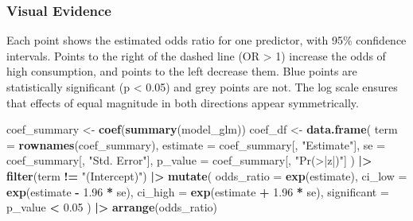 \documentclass[
]{article}
\newenvironment{Shaded}{\begin{snugshade}}{\end{snugshade}}
\newcommand{\AttributeTok}[1]{\textcolor[rgb]{0.13,0.29,0.53}{#1}}
\newcommand{\FloatTok}[1]{\textcolor[rgb]{0.00,0.00,0.81}{#1}}
\newcommand{\FunctionTok}[1]{\textcolor[rgb]{0.13,0.29,0.53}{\textbf{#1}}}
\newcommand{\NormalTok}[1]{#1}
\newcommand{\OtherTok}[1]{\textcolor[rgb]{0.56,0.35,0.01}{#1}}
\newcommand{\SpecialCharTok}[1]{\textcolor[rgb]{0.81,0.36,0.00}{\textbf{#1}}}
\newcommand{\StringTok}[1]{\textcolor[rgb]{0.31,0.60,0.02}{#1}}
\begin{document}
\subsubsection{Visual Evidence}\label{visual-evidence-2}

Each point shows the estimated odds ratio for one predictor, with 95\%
confidence intervals. Points to the right of the dashed line (OR
\textgreater{} 1) increase the odds of high consumption, and points to
the left decrease them. Blue points are statistically significant (p
\textless{} 0.05) and grey points are not. The log scale ensures that
effects of equal magnitude in both directions appear symmetrically.

\begin{Shaded}
\begin{Highlighting}[]
\NormalTok{coef\_summary }\OtherTok{\textless{}{-}} \FunctionTok{coef}\NormalTok{(}\FunctionTok{summary}\NormalTok{(model\_glm))}
\NormalTok{coef\_df }\OtherTok{\textless{}{-}} \FunctionTok{data.frame}\NormalTok{(}
  \AttributeTok{term =} \FunctionTok{rownames}\NormalTok{(coef\_summary),}
  \AttributeTok{estimate =}\NormalTok{ coef\_summary[, }\StringTok{"Estimate"}\NormalTok{],}
  \AttributeTok{se =}\NormalTok{ coef\_summary[, }\StringTok{"Std. Error"}\NormalTok{],}
  \AttributeTok{p\_value =}\NormalTok{ coef\_summary[, }\StringTok{"Pr(\textgreater{}|z|)"}\NormalTok{]}
\NormalTok{) }\SpecialCharTok{|\textgreater{}}
  \FunctionTok{filter}\NormalTok{(term }\SpecialCharTok{!=} \StringTok{"(Intercept)"}\NormalTok{) }\SpecialCharTok{|\textgreater{}}
  \FunctionTok{mutate}\NormalTok{(}
    \AttributeTok{odds\_ratio =} \FunctionTok{exp}\NormalTok{(estimate),}
    \AttributeTok{ci\_low =} \FunctionTok{exp}\NormalTok{(estimate }\SpecialCharTok{{-}} \FloatTok{1.96} \SpecialCharTok{*}\NormalTok{ se),}
    \AttributeTok{ci\_high =} \FunctionTok{exp}\NormalTok{(estimate }\SpecialCharTok{+} \FloatTok{1.96} \SpecialCharTok{*}\NormalTok{ se),}
    \AttributeTok{significant =}\NormalTok{ p\_value }\SpecialCharTok{\textless{}} \FloatTok{0.05}
\NormalTok{  ) }\SpecialCharTok{|\textgreater{}}
  \FunctionTok{arrange}\NormalTok{(odds\_ratio)}


\end{Highlighting}
\end{Shaded}
\end{document}
